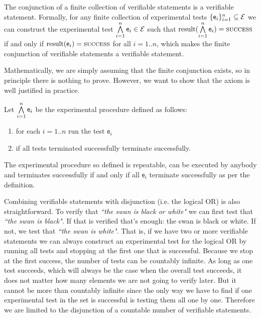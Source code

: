 \documentclass[11pt,letterpaper,fleqn]{memoir} %
\begin{document}
\begin{mathSection}
	\begin{axiom}\label{def_experimental_test_AND}
	The conjunction of a finite collection of verifiable statements is a verifiable statement. Formally, for any finite collection of experimental tests $\{\mathsf{e}_i\}_{i=1}^{n} \subseteq \mathcal{E}$ we can construct the experimental test $ \bigwedge\limits_{i=1}^{n} \mathsf{e}_i \in \mathcal{E}$ such that $\operatorname{result}(\bigwedge\limits_{i=1}^{n} \mathsf{e}_i) = \textsc{success}$ if and only if $\operatorname{result}(\mathsf{e}_i) = \textsc{success}$ for all $i=1..n$, which makes the finite conjunction of verifiable statements a verifiable statement.
	\end{axiom}
	\begin{justification}
		Mathematically, we are simply assuming that the finite conjunction exists, so in principle there is nothing to prove. However, we want to show that the axiom is well justified in practice.
		
		Let $\bigwedge\limits_{i=1}^{n} \mathsf{e}_i$ be the experimental procedure defined as follows:
		\begin{enumerate}
			\item for each $i=1..n$ run the test $\mathsf{e}_i$
			\item if all tests terminated successfully terminate successfully.
		\end{enumerate}
		The experimental procedure so defined is repeatable, can be executed by anybody and terminates successfully if and only if all $\mathsf{e}_i$ terminate successfully as per the definition.
	\end{justification}
\end{mathSection}	

Combining verifiable statements with disjunction (i.e. the logical OR) is also straightforward. To verify that \emph{``the swan is black or white"} we can first test that \emph{``the swan is black"}. If that is verified that's enough: the swan is black or white. If not, we test that \emph{``the swan is white"}. That is, if we have two or more verifiable statements we can always construct an experimental test for the logical OR by running all tests and stopping at the first one that is successful. Because we stop at the first success, the number of tests can be countably infinite. As long as one test succeeds, which will always be the case when the overall test succeeds, it does not matter how many elements we are not going to verify later. But it cannot be more than countably infinite since the only way we have to find if one experimental test in the set is successful is testing them all one by one. Therefore we are limited to the disjunction of a countable number of verifiable statements.
\end{document}
